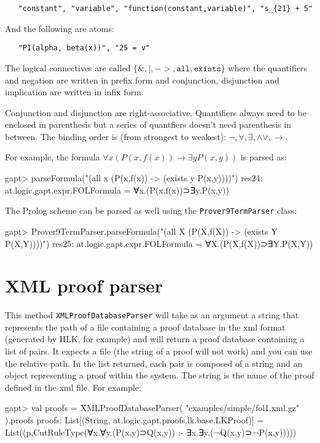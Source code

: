 \documentclass[a4paper,11pt]{article}
\renewcommand{\land}{\wedge}
\renewcommand{\lor}{\vee}
\begin{document}
\begin{appendix}
 \begin{lstlisting}
   "constant", "variable", "function(constant,variable)", "s_{21} + 5"
 \end{lstlisting}

And the following are atoms:

 \begin{lstlisting}
   "P1(alpha, beta(x))", "25 = v"
 \end{lstlisting}

The logical connectives are called $\{\mathtt{\&,|,->,all,exists}\}$ where
 the quantifiers and negation are written in prefix form and conjunction,
 disjunction and implication are written in infix form.

Conjunction and disjunction are right-associative. Quantifiers always need to
 be enclosed in parenthesis but a series of quantfiers doesn't need parenthesis
 in between. The binding order is (from strongest to weakest):
 $\mathtt{\neg,\forall,\exists,\land\lor,\rightarrow}$.


For example, the formula $\forall x (P(x,f(x)) \rightarrow \exists y P(x,y))$
 is parsed as:

\begin{clilisting}
gapt> parseFormula("(all x (P(x,f(x)) -> (exists y P(x,y))))")
res24: at.logic.gapt.expr.FOLFormula = ∀x.(P(x,f(x))⊃∃y.P(x,y))

\end{clilisting}

The Prolog scheme can be parsed as well using the \texttt{Prover9TermParser}
class:

\begin{clilisting}
gapt> Prover9TermParser.parseFormula("(all X (P(X,f(X)) -> (exists Y P(X,Y))))")
res25: at.logic.gapt.expr.FOLFormula = ∀X.(P(X,f(X))⊃∃Y.P(X,Y))

\end{clilisting}

\section{XML proof parser}\label{sec.fileio}

This method \texttt{XMLProofDatabaseParser} will take as an argument a string that represents the path of a file
containing a proof database in the xml format (generated by HLK, for example) and
will return a proof database containing a list 
of pairs. It expects a file (the string of a proof will not work) and you can use 
the relative path. In the list returned, each pair is composed of a string and 
an object representing a proof within the system. The string is the name of the 
proof defined in the xml file. For example:
%
\begin{clilisting}
gapt> val proofs = XMLProofDatabaseParser( "examples/simple/fol1.xml.gz" ).proofs
proofs: List[(String, at.logic.gapt.proofs.lk.base.LKProof)] = List((p,CutRuleType(∀x.∀y.(P(x,y)⊃Q(x,y)) :- ∃x.∃y.(¬Q(x,y)⊃¬P(x,y)))))


\end{clilisting}
\end{appendix}
\end{document}
